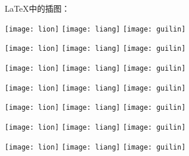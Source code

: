 \documentclass{ctexart}%
\begin{document}
	\LaTeX{}中的插图：
	
	\texttt{[image: lion]}
	\texttt{[image: liang]}
	\texttt{[image: guilin]}
	
    \texttt{[image: lion]}
	\texttt{[image: liang]}
	\texttt{[image: guilin]}
	
	\texttt{[image: lion]}
	\texttt{[image: liang]}
	\texttt{[image: guilin]}
	
	\texttt{[image: lion]}
    \texttt{[image: liang]}
    \texttt{[image: guilin]}
    
	\texttt{[image: lion]}
    \texttt{[image: liang]}
    \texttt{[image: guilin]}
    
    \texttt{[image: lion]}
    \texttt{[image: liang]}
    \texttt{[image: guilin]}  
    
    \texttt{[image: lion]}
    \texttt{[image: liang]}
    \texttt{[image: guilin]}	
\end{document}
